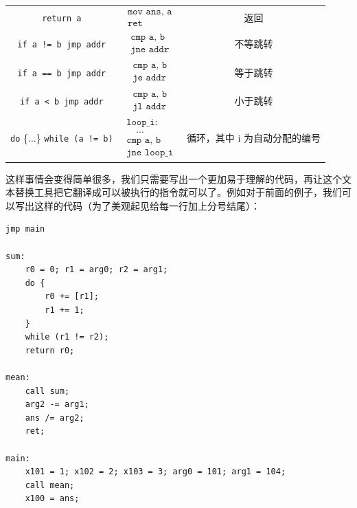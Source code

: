 \begin{center}
\begin{tabular}{c|c|c}
        \texttt{return a}                           & $\boxed{\begin{array}{l} \texttt{mov ans, a} \\ \texttt{ret} \end{array}}$                                                 & 返回               \\[20pt]
        \texttt{if a != b jmp addr}                 & $\boxed{\begin{array}{l} \texttt{cmp a, b} \\ \texttt{jne addr} \end{array}}$                                              & 不等跳转             \\[20pt]
        \texttt{if a == b jmp addr}                 & $\boxed{\begin{array}{l} \texttt{cmp a, b} \\ \texttt{je addr} \end{array}}$                                               & 等于跳转             \\[20pt]
        \texttt{if a < b jmp addr}                  & $\boxed{\begin{array}{l} \texttt{cmp a, b} \\ \texttt{jl addr} \end{array}}$                                               & 小于跳转             \\[20pt]
        \texttt{do} \{...\} \texttt{while (a != b)} & $\boxed{\begin{array}{l} \texttt{loop\_i:} \\ \quad\texttt{...} \\ \texttt{cmp a, b} \\ \texttt{jne loop\_i} \end{array}}$ & 循环，其中 i 为自动分配的编号 \\[40pt]
        \hline
    \end{tabular}
\end{center}

这样事情会变得简单很多，我们只需要写出一个更加易于理解的代码，再让这个文本替换工具把它翻译成可以被执行的指令就可以了。例如对于前面的例子，我们可以写出这样的代码（为了美观起见给每一行加上分号结尾）：
\begin{verbatim}
jmp main

sum:
    r0 = 0; r1 = arg0; r2 = arg1;
    do {
        r0 += [r1];
        r1 += 1;
    } 
    while (r1 != r2);
    return r0;

mean:
    call sum;
    arg2 -= arg1;
    ans /= arg2;
    ret;

main:
    x101 = 1; x102 = 2; x103 = 3; arg0 = 101; arg1 = 104;
    call mean;
    x100 = ans;
\end{verbatim}

